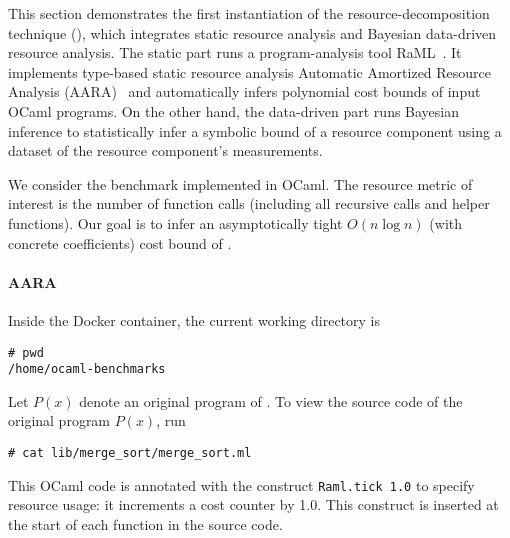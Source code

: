 This section demonstrates the first instantiation of the resource-decomposition
technique (), which integrates static
resource analysis and Bayesian data-driven resource analysis.
%
The static part runs a program-analysis tool RaML~\citep{RaML}.
%
It implements type-based static resource analysis Automatic Amortized Resource
Analysis (AARA)~\citep{Hoffmann2011a,Hoffmann2017} and automatically infers
polynomial cost bounds of input OCaml programs.
%
On the other hand, the data-driven part runs Bayesian inference to statistically
infer a symbolic bound of a resource component using a dataset of the resource
component's measurements.

We consider the benchmark \mergesort{} implemented in OCaml.
%
The resource metric of interest is the number of function calls (including all
recursive calls and helper functions).
%
Our goal is to infer an asymptotically tight $O (n \log n)$ (with concrete
coefficients) cost bound of \mergesort{}.

\paragraph{AARA}

Inside the Docker container, the current working directory is
\begin{verbatim}
# pwd
/home/ocaml-benchmarks
\end{verbatim}
%
Let $P(x)$ denote an original program of \mergesort{}.
%
To view the source code of the original program $P(x)$, run
\begin{verbatim}
# cat lib/merge_sort/merge_sort.ml
\end{verbatim}
%
This OCaml code is annotated with the construct \texttt{Raml.tick 1.0} to
specify resource usage: it increments a cost counter by 1.0.
%
This construct is inserted at the start of each function in the source code.

